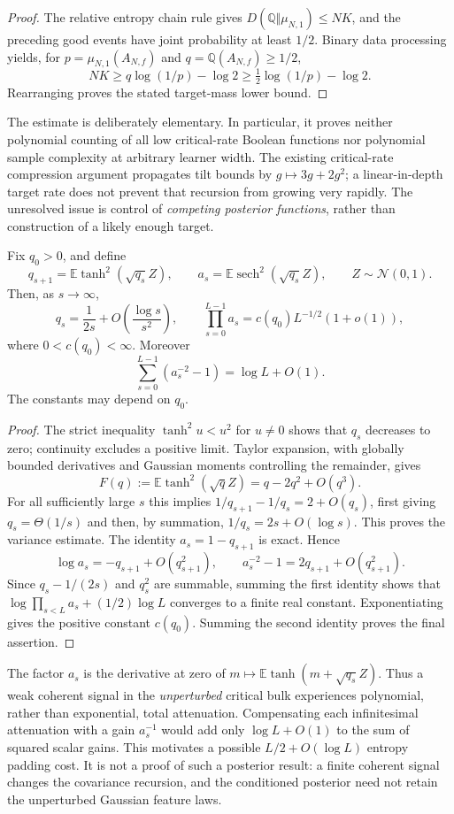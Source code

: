 \begin{proof}
The relative entropy chain rule gives
$D(\mathbb Q\Vert\mu_{N,1})\le NK$, and the preceding good events have
joint probability at least $1/2$. Binary data processing yields, for
$p=\mu_{N,1}(A_{N,f})$ and $q=\mathbb Q(A_{N,f})\ge1/2$,
\[
 NK\ge q\log(1/p)-\log2\ge\tfrac12\log(1/p)-\log2.
\]
Rearranging proves the stated target-mass lower bound.
\end{proof}

The estimate is deliberately elementary. In particular, it proves
neither polynomial counting of all low critical-rate Boolean functions
nor polynomial sample complexity at arbitrary learner width. The
existing critical-rate compression argument propagates tilt bounds by
$g\mapsto3g+2g^2$; a linear-in-depth target rate does not prevent that
recursion from growing very rapidly. The unresolved issue is control of
\emph{competing posterior functions}, rather than construction of a
likely enough target.

\begin{lemma}
\label{lem:critical-bulk-attenuation}
Fix $q_0>0$, and define
\[
 q_{s+1}=\mathbb E\tanh^2(\sqrt{q_s}Z),\qquad
 a_s=\mathbb E\operatorname{sech}^2(\sqrt{q_s}Z),
 \qquad Z\sim\mathcal N(0,1).
\]
Then, as $s\to\infty$,
\[
 q_s=\frac1{2s}+O\!\left(\frac{\log s}{s^2}\right),\qquad
 \prod_{s=0}^{L-1}a_s=c(q_0)L^{-1/2}(1+o(1)),
\]
where $0<c(q_0)<\infty$. Moreover
\[
 \sum_{s=0}^{L-1}(a_s^{-2}-1)=\log L+O(1).
\]
The constants may depend on $q_0$.
\end{lemma}

\begin{proof}
The strict inequality $\tanh^2 u<u^2$ for $u\ne0$ shows that $q_s$
decreases to zero; continuity excludes a positive limit.
Taylor expansion, with globally bounded derivatives and Gaussian
moments controlling the remainder, gives
\[
 F(q):=\mathbb E\tanh^2(\sqrt qZ)=q-2q^2+O(q^3).
\]
For all sufficiently large $s$ this implies
$1/q_{s+1}-1/q_s=2+O(q_s)$, first giving $q_s=\Theta(1/s)$ and then,
by summation, $1/q_s=2s+O(\log s)$. This proves the variance estimate.
The identity $a_s=1-q_{s+1}$ is exact. Hence
\[
 \log a_s=-q_{s+1}+O(q_{s+1}^2),\qquad
 a_s^{-2}-1=2q_{s+1}+O(q_{s+1}^2).
\]
Since $q_s-1/(2s)$ and $q_s^2$ are summable, summing the first identity
shows that $\log\prod_{s<L}a_s+(1/2)\log L$ converges to a finite real
constant. Exponentiating gives the positive constant $c(q_0)$.
Summing the second identity proves the final assertion.
\end{proof}

The factor $a_s$ is the derivative at zero of
$m\mapsto\mathbb E\tanh(m+\sqrt{q_s}Z)$. Thus a weak coherent signal
in the \emph{unperturbed} critical bulk experiences polynomial, rather
than exponential, total attenuation. Compensating each infinitesimal
attenuation with a gain $a_s^{-1}$ would add only $\log L+O(1)$ to the
sum of squared scalar gains. This motivates a possible
$L/2+O(\log L)$ entropy padding cost. It is not a proof of such a
posterior result: a finite coherent signal changes the covariance
recursion, and the conditioned posterior need not retain the
unperturbed Gaussian feature laws.

